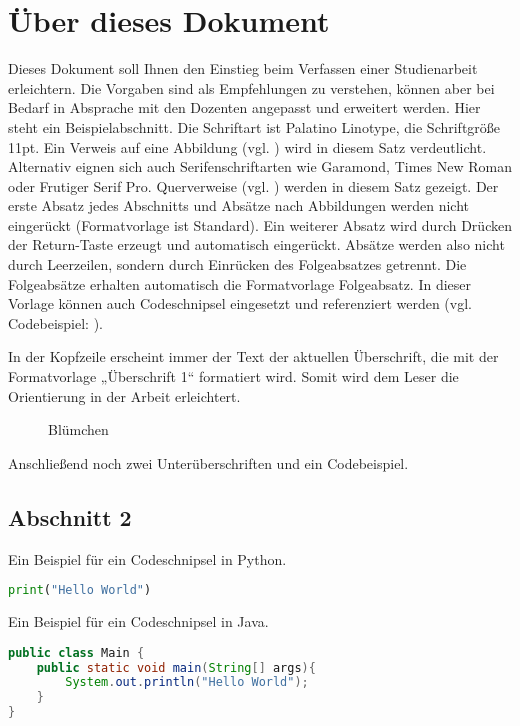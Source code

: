 \documentclass{mi-graduation}
\begin{document}
\section{Über dieses Dokument}
Dieses Dokument soll Ihnen den Einstieg beim Verfassen einer Studienarbeit erleichtern.
Die Vorgaben sind als Empfehlungen zu verstehen, können aber bei Bedarf in Absprache mit den Dozenten angepasst und erweitert werden.
Hier steht ein Beispielabschnitt.
Die Schriftart ist Palatino Linotype, die Schriftgröße 11pt.
Ein Verweis auf eine Abbildung (vgl. ) wird in diesem Satz verdeutlicht.
Alternativ eignen sich auch Serifenschriftarten wie Garamond, Times New Roman oder Frutiger Serif Pro.
Querverweise (vgl. ) werden in diesem Satz  gezeigt.
Der erste Absatz jedes Abschnitts und Absätze nach Abbildungen werden nicht eingerückt (Formatvorlage ist Standard).
Ein weiterer Absatz wird durch Drücken der Return-Taste erzeugt und automatisch eingerückt.
Absätze werden also nicht durch Leerzeilen, sondern durch Einrücken des Folgeabsatzes getrennt.
Die Folgeabsätze erhalten automatisch die Formatvorlage Folgeabsatz.
In dieser Vorlage können auch Codeschnipsel eingesetzt und referenziert werden (vgl. Codebeispiel: ).

In der Kopfzeile erscheint immer der Text der aktuellen Überschrift, die mit der Formatvorlage „Überschrift 1“ formatiert wird. Somit wird dem Leser die Orientierung in der Arbeit erleichtert.\\

\begin{figure}[h!]
	\caption{Blümchen \citep{Norman:2002}}
	\label{img:norman2010}
\end{figure}

Anschließend noch zwei Unterüberschriften und ein Codebeispiel.

\subsection{Abschnitt 2}\label{section:2}
Ein Beispiel für ein Codeschnipsel in Python.\\

\begin{lstlisting}[captionpos=b, belowcaptionskip=4pt, caption=Hello World (Python), label=helloworld, language=Python]
print("Hello World")
\end{lstlisting}

Ein Beispiel für ein Codeschnipsel in Java.\\

\begin{lstlisting}[captionpos=b, belowcaptionskip=4pt, caption=Hello World (Java), language=Java]
public class Main {
	public static void main(String[] args){
		System.out.println("Hello World");
	}
}
\end{lstlisting}

\newpage



\newpage


\newpage

\end{document}
